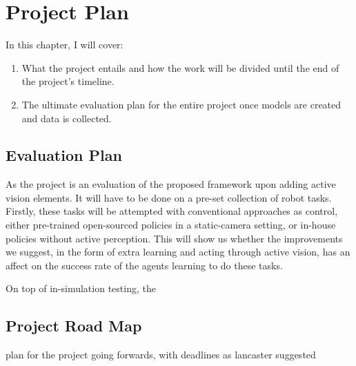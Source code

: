 \chapter{Project Plan}
  In this chapter, I will cover:
  \begin{enumerate}
    \item What the project entails and how the work will be divided until the end of the project's timeline.
    \item The ultimate evaluation plan for the entire project once models are created and data is collected.
  \end{enumerate}

\section{Evaluation Plan}
As the project is an evaluation of the proposed framework upon adding active vision elements. It will have to be done on a pre-set collection of robot tasks. 
Firstly, these tasks will be attempted with conventional approaches as control, either pre-trained open-sourced policies in a static-camera setting, or in-house policies without active perception. This will show us whether the improvements we suggest, in the form of extra learning and acting through active vision, has an affect on the success rate of the agents learning to do these tasks.

On top of in-simulation testing, the 

\section{Project Road Map}
plan for the project going forwards, with deadlines as lancaster suggested